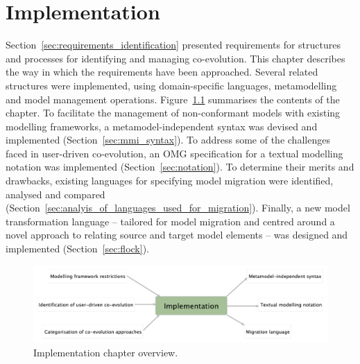 
\chapter{Implementation}
\label{Implementation}
Section~\ref{sec:requirements_identification} presented requirements for structures and processes for identifying and managing co-evolution. This chapter describes the way in which the requirements have been approached. Several related structures were implemented, using domain-specific languages, metamodelling and model management operations. Figure~\ref{fig:implementation_overview} summarises the contents of the chapter. To facilitate the management of non-conformant models with existing modelling frameworks, a metamodel-independent syntax was devised and implemented (Section~\ref{sec:mmi_syntax}). To address some of the challenges faced in user-driven co-evolution, an OMG specification for a textual modelling notation was implemented (Section~\ref{sec:notation}). To determine their merits and drawbacks, existing languages for specifying model migration were identified, analysed and compared (Section~\ref{sec:analyis_of_languages_used_for_migration}). Finally, a new model transformation language -- tailored for model migration and centred around a novel approach to relating source and target model elements -- was designed and implemented (Section~\ref{sec:flock}). 

\begin{figure}[htbp]
  \begin{center}
    \leavevmode
    \includegraphics[width=12cm]{5.Implementation/overview.pdf}
  \end{center}
  \caption{Implementation chapter overview.}
  \label{fig:implementation_overview}
\end{figure}








